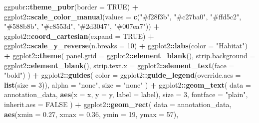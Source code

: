 \documentclass[
]{book}
\newenvironment{Shaded}{\begin{snugshade}}{\end{snugshade}}
\newcommand{\AttributeTok}[1]{\textcolor[rgb]{0.13,0.29,0.53}{#1}}
\newcommand{\ConstantTok}[1]{\textcolor[rgb]{0.56,0.35,0.01}{#1}}
\newcommand{\DecValTok}[1]{\textcolor[rgb]{0.00,0.00,0.81}{#1}}
\newcommand{\FloatTok}[1]{\textcolor[rgb]{0.00,0.00,0.81}{#1}}
\newcommand{\FunctionTok}[1]{\textcolor[rgb]{0.13,0.29,0.53}{\textbf{#1}}}
\newcommand{\NormalTok}[1]{#1}
\newcommand{\SpecialCharTok}[1]{\textcolor[rgb]{0.81,0.36,0.00}{\textbf{#1}}}
\newcommand{\StringTok}[1]{\textcolor[rgb]{0.31,0.60,0.02}{#1}}
\begin{document}
\begin{Shaded}
\begin{Highlighting}[]
\NormalTok{  ggpubr}\SpecialCharTok{::}\FunctionTok{theme\_pubr}\NormalTok{(}\AttributeTok{border =} \ConstantTok{TRUE}\NormalTok{) }\SpecialCharTok{+}
\NormalTok{  ggplot2}\SpecialCharTok{::}\FunctionTok{scale\_color\_manual}\NormalTok{(}\AttributeTok{values =} \FunctionTok{c}\NormalTok{(}\StringTok{"\#f28f3b"}\NormalTok{, }\StringTok{"\#c27ba0"}\NormalTok{, }\StringTok{"\#ffd5c2"}\NormalTok{, }\StringTok{"\#588b8b"}\NormalTok{, }\StringTok{"\#c8553d"}\NormalTok{, }\StringTok{"\#2d3047"}\NormalTok{, }\StringTok{"\#007ea7"}\NormalTok{)) }\SpecialCharTok{+}
\NormalTok{  ggplot2}\SpecialCharTok{::}\FunctionTok{coord\_cartesian}\NormalTok{(}\AttributeTok{expand =} \ConstantTok{TRUE}\NormalTok{) }\SpecialCharTok{+}
\NormalTok{  ggplot2}\SpecialCharTok{::}\FunctionTok{scale\_y\_reverse}\NormalTok{(}\AttributeTok{n.breaks =} \DecValTok{10}\NormalTok{) }\SpecialCharTok{+}
\NormalTok{  ggplot2}\SpecialCharTok{::}\FunctionTok{labs}\NormalTok{(}\AttributeTok{color =} \StringTok{"Habitat"}\NormalTok{) }\SpecialCharTok{+}
\NormalTok{  ggplot2}\SpecialCharTok{::}\FunctionTok{theme}\NormalTok{(}
    \AttributeTok{panel.grid =}\NormalTok{ ggplot2}\SpecialCharTok{::}\FunctionTok{element\_blank}\NormalTok{(),}
    \AttributeTok{strip.background =}\NormalTok{ ggplot2}\SpecialCharTok{::}\FunctionTok{element\_blank}\NormalTok{(),}
    \AttributeTok{strip.text.x =}\NormalTok{ ggplot2}\SpecialCharTok{::}\FunctionTok{element\_text}\NormalTok{(}\AttributeTok{face =} \StringTok{"bold"}\NormalTok{)}
\NormalTok{  ) }\SpecialCharTok{+}
\NormalTok{  ggplot2}\SpecialCharTok{::}\FunctionTok{guides}\NormalTok{(}
    \AttributeTok{color =}\NormalTok{ ggplot2}\SpecialCharTok{::}\FunctionTok{guide\_legend}\NormalTok{(}\AttributeTok{override.aes =} \FunctionTok{list}\NormalTok{(}\AttributeTok{size =} \DecValTok{3}\NormalTok{)),}
    \AttributeTok{alpha =} \StringTok{"none"}\NormalTok{,}
    \AttributeTok{size =} \StringTok{"none"}
\NormalTok{  ) }\SpecialCharTok{+}
\NormalTok{  ggplot2}\SpecialCharTok{::}\FunctionTok{geom\_text}\NormalTok{(}
    \AttributeTok{data =}\NormalTok{ annotation\_data,}
    \FunctionTok{aes}\NormalTok{(}\AttributeTok{x =}\NormalTok{ x, }\AttributeTok{y =}\NormalTok{ y, }\AttributeTok{label =}\NormalTok{ label),}
    \AttributeTok{size =} \DecValTok{3}\NormalTok{,}
    \AttributeTok{fontface =} \StringTok{"plain"}\NormalTok{,}
    \AttributeTok{inherit.aes =} \ConstantTok{FALSE}
\NormalTok{  ) }\SpecialCharTok{+}
\NormalTok{  ggplot2}\SpecialCharTok{::}\FunctionTok{geom\_rect}\NormalTok{(}
    \AttributeTok{data =}\NormalTok{ annotation\_data,}
    \FunctionTok{aes}\NormalTok{(}\AttributeTok{xmin =} \FloatTok{0.27}\NormalTok{, }\AttributeTok{xmax =} \FloatTok{0.36}\NormalTok{, }\AttributeTok{ymin =} \DecValTok{19}\NormalTok{, }\AttributeTok{ymax =} \DecValTok{57}\NormalTok{),}

\end{Highlighting}
\end{Shaded}
\end{document}
